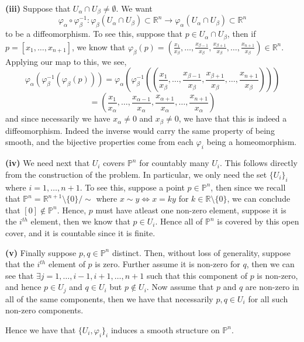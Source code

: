 \documentclass[10pt]{article}
\newcommand{\R}{\mathbb{R}}
\newcommand{\Pro}{\mathbb{P}}
\begin{document}
\textbf{(iii)}
Suppose that $U_{\alpha}\cap U_{\beta} \neq \emptyset$. We want
$$\varphi_{\alpha}\circ\varphi_{\beta}^{-1}: \varphi_{\beta}(U_{\alpha}\cap U_{\beta}) \subset \R^{n} \to \varphi_{\alpha}(U_{\alpha}\cap U_{\beta})\subset \R^{n}$$
to be a diffeomorphism. To see this, suppose that $p\in U_{\alpha}\cap U_{\beta}$, then if $p = [x_{1}, \dots, x_{n+1}]$, we know that $\varphi_{\beta}(p) = \left(\frac{x_{1}}{x_{\beta}},\dots,\frac{x_{\beta -1}}{x_{\beta}},\frac{x_{\beta+1}}{x_{\beta}},\dots,\frac{x_{n+1}}{x_{\beta}}\right)\in \R^{n}$. Applying our map to this, we see,
$$\varphi_{\alpha}(\varphi_{\beta}^{-1}(\varphi_{\beta}(p))) = \varphi_{\alpha}\left(\varphi_{\beta}^{-1}\left(\left(\frac{x_{1}}{x_{\beta}},\dots,\frac{x_{\beta -1}}{x_{\beta}},\frac{x_{\beta+1}}{x_{\beta}},\dots,\frac{x_{n+1}}{x_{\beta}}\right)\right)\right)$$
$$ = \left(\frac{x_{1}}{x_{\alpha}},\dots,\frac{x_{\alpha -1}}{x_{\alpha}},\frac{x_{\alpha+1}}{x_{\alpha}},\dots,\frac{x_{n+1}}{x_{\alpha}}\right)$$
and since necessarily we have $x_{\alpha} \neq 0$ and $x_{\beta} \neq 0$, we have that this is indeed a diffeomorphism. Indeed the inverse would carry the same property of being smooth, and the bijective properties come from each $\varphi_{i}$ being a homeomorphism.

\textbf{(iv)}
We need next that $U_{i}$ covers $\Pro^{n}$ for countably many $U_{i}$. This follows directly from the construction of the problem. In particular, we only need the set $\{U_{i}\}_{i}$ where $i = 1,\dots,n+1$. To see this, suppose a point $p\in \Pro^{n}$, then since we recall that $\Pro^{n} = \R^{n+1}\setminus\{0\}/\sim$ where $x \sim y \iff x = ky$ for $k\in \R\setminus \{0\}$, we can conclude that $[0]\notin \Pro^{n}$. Hence, $p$ must have atleast one non-zero element, suppose it is the $i^{th}$ element, then we know that $p\in U_{i}$. Hence all of $\Pro^{n}$ is covered by this open cover, and it is countable since it is finite.

\textbf{(v)} Finally suppose $p,q\in \Pro^{n}$ distinct. Then, without loss of generality, suppose that the $i^{th}$ element of $p$ is zero. Further assume it is non-zero for $q$, then we can see that $\exists j = 1,\dots,i-1,i+1,\dots,n+1$ such that this component of $p$ is non-zero, and hence $p\in U_{j}$ and $q\in U_{i}$ but $p\notin U_{i}$. Now assume that $p$ and $q$ are non-zero in all of the same components, then we have that necessarily $p,q\in U_{i}$ for all such non-zero components.

Hence we have that $\{U_{i},\varphi_{i}\}_{i}$ induces a smooth structure on $\Pro^{n}$.
\end{document}
